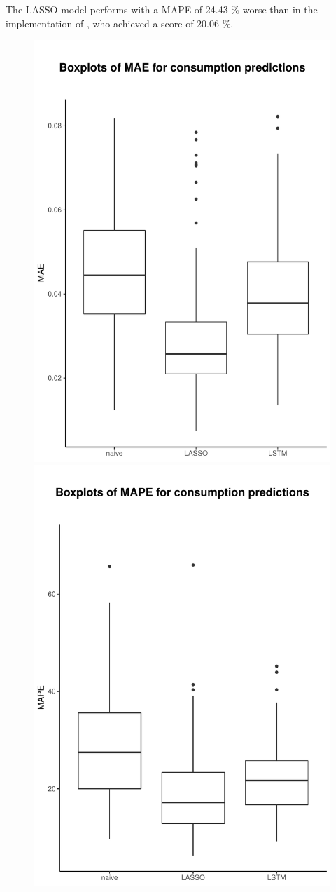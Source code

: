 The LASSO model performs with a MAPE of 24.43 \% worse than in the implementation of \citet{Li:2017}, who achieved a score of 20.06 \%.
%
\begin{figure}
    \centering
    \includegraphics[width=.5\textwidth-0.15em]{thesis/graphs/evaluation/c_boxplot_MAE.pdf}
    \includegraphics[width=.5\textwidth-0.15em]{thesis/graphs/evaluation/c_boxplot_MAPE.pdf} \\
    

\end{figure}
